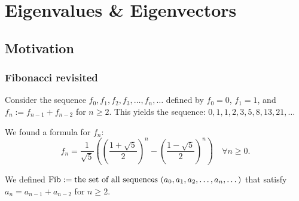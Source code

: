 \setcounter{chapter}{20} %
\chapter{Eigenvalues \& Eigenvectors}

%
\renewcommand{\thetheorem}{21.a.\arabic{theorem}}
\setcounter{theorem}{0}

\section{Motivation}

\subsection{Fibonacci revisited}
Consider the sequence $f_0, f_1, f_2, f_3, \dots, f_n, \dots$ defined by $f_0 = 0$, $f_1 = 1$, and $f_n := f_{n-1} + f_{n-2}$ for $n \ge 2$.
This yields the sequence: $0, 1, 1, 2, 3, 5, 8, 13, 21, \dots$

We found a formula for $f_n$:
\[ f_n = \frac{1}{\sqrt{5}} \left( \left(\frac{1+\sqrt{5}}{2}\right)^n - \left(\frac{1-\sqrt{5}}{2}\right)^n \right) \quad \forall n \ge 0. \]

We defined $\operatorname{Fib} := \text{the set of all sequences } (a_0, a_1, a_2, \dots, a_n, \dots)$ that satisfy $a_n = a_{n-1} + a_{n-2}$ for $n \ge 2$.

